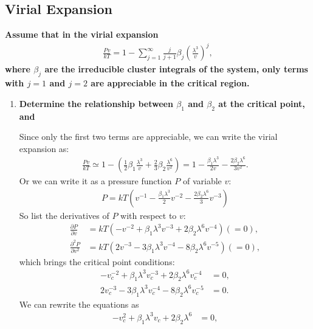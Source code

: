\documentclass[../../main.tex]{subfiles}
\begin{document}
  \subsection{Virial Expansion}
  \textbf{Assume that in the virial expansion
  \begin{align*}
    \frac{Pv}{kT} = 1 - \sum_{j=1}^{\infty}\frac{j}{j+1}\beta_{j}\left(\frac{\lambda^{3}}{v}\right)^{j},
  \end{align*}
  where $\beta_{j}$ are the irreducible cluster integrals of the system, only terms with $j = 1$ and $j = 2$ are appreciable in the critical region. }
  \begin{enumerate}
    \item \textbf{Determine the relationship between $\beta_{1}$ and $\beta_{2}$ at the critical point, and} 
    
    Since only the first two terms are appreciable, we can write the virial expansion as:
  \begin{align*}
    \frac{Pv}{kT} \simeq 1 - \left(\frac{1}{2}\beta_{1}\frac{\lambda^{3}}{v} + \frac{2}{3}\beta_{2}\frac{\lambda^{6}}{v^{2}}\right) = 1 - \frac{\beta_{1}\lambda^{3}}{2v} - \frac{2\beta_{2}\lambda^{6}}{3v^{2}}.
  \end{align*}
  Or we can write it as a pressure function $P$ of variable $v$:
  \begin{align*}
    P = kT\left(v^{-1} - \frac{\beta_{1}\lambda^{3}}{2}v^{-2} - \frac{2\beta_{2}\lambda^{6}}{3}v^{-3}\right)
  \end{align*}
  So list the derivatives of $P$ with respect to $v$:
  \begin{align*}
    \frac{\partial P}{\partial v} &= kT(-v^{-2} + \beta_{1}\lambda^{3}v^{-3} + 2\beta_{2}\lambda^{6}v^{-4}) (= 0),\\
    \frac{\partial^{2}P}{\partial v^{2}} &= kT(2v^{-3} - 3\beta_{1}\lambda^{3}v^{-4} - 8\beta_{2}\lambda^{6}v^{-5}) (= 0),
  \end{align*}
  which brings the critical point conditions:
  \begin{align*}
    -v_{c}^{-2} + \beta_{1}\lambda^{3}v_{c}^{-3} + 2\beta_{2}\lambda^{6}v_{c}^{-4} &= 0,\\
    2v_{c}^{-3} - 3\beta_{1}\lambda^{3}v_{c}^{-4} - 8\beta_{2}\lambda^{6}v_{c}^{-5} &= 0.
  \end{align*}
  We can rewrite the equations as
  \begin{align}
    -v_{c}^{2} + \beta_{1}\lambda^{3}v_{c} + 2\beta_{2}\lambda^{6} &= 0,\label{eq:1}\\

\end{align}
\end{enumerate}
\end{document}
